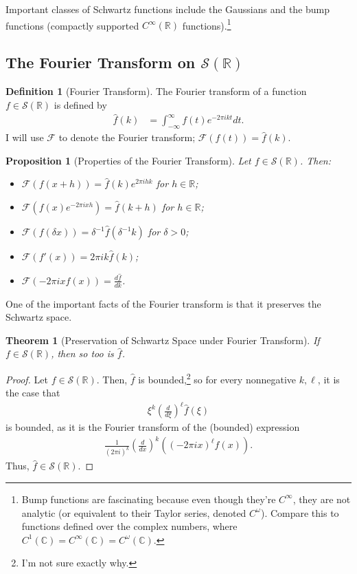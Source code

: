 \documentclass[12pt]{extarticle}
\newcommand{\R}{\mathbb{R}}
\newcommand{\C}{\mathbb{C}}
\theoremstyle{plain}
\newtheorem*{theorem}{Theorem}%
\newtheorem*{proposition}{Proposition}%
\theoremstyle{definition}
\newtheorem*{definition}{Definition}
\theoremstyle{remark}
\begin{document}
  Important classes of Schwartz functions include the Gaussians and the bump functions (compactly supported $C^{\infty}(\R)$ functions).\footnote{Bump functions are fascinating because even though they're $C^{\infty}$, they are not analytic (or equivalent to their Taylor series, denoted $C^{\omega}$). Compare this to functions defined over the complex numbers, where $C^{1}(\C) = C^{\infty}(\C) = C^{\omega}(\C)$.}
  \subsection{The Fourier Transform on $\mathcal{S}(\R)$}%
  \begin{definition}[Fourier Transform]
    The Fourier transform of a function $f\in \mathcal{S}(\R)$ is defined by
    \begin{align*}
      \hat{f}(k) &= \int_{-\infty}^{\infty}f(t)e^{-2\pi i k t}dt.
    \end{align*}
    I will use $\mathcal{F}$ to denote the Fourier transform; $\mathcal{F}(f(t)) = \hat{f}(k)$. 
  \end{definition}
  \begin{proposition}[Properties of the Fourier Transform]
    Let $f\in \mathcal{S}(\R)$. Then:
    \begin{itemize}
      \item $\displaystyle\mathcal{F}(f(x+h)) = \hat{f}(k)e^{2\pi i h k}$ for $h\in \R$;
      \item $\displaystyle \mathcal{F}\left(f(x)e^{-2\pi i x h}\right) = \hat{f}(k + h)$ for $h\in \R$;
      \item $\displaystyle \mathcal{F}\left(f(\delta x)\right) = \delta^{-1}\hat{f}(\delta^{-1}k)$ for $\delta > 0$;
      \item $\mathcal{F}(f'(x)) = 2\pi i k \hat{f}(k)$;
      \item $\mathcal{F}(-2\pi i x f(x)) = \frac{d\hat{f}}{dk}$.
    \end{itemize}
  \end{proposition}
  One of the important facts of the Fourier transform is that it preserves the Schwartz space.
  \begin{theorem}[Preservation of Schwartz Space under Fourier Transform]
    If $f\in \mathcal{S}(\R)$, then so too is $\hat{f}$.
  \end{theorem}
  \begin{proof}
    Let $f\in \mathcal{S}(\R)$. Then, $\hat{f}$ is bounded,\footnote{I'm not sure exactly why.} so for every nonnegative $k,\ell$, it is the case that
    \begin{align*}
      \xi^{k}\left(\frac{d}{d\xi}\right)^{\ell}\hat{f}(\xi)
    \end{align*}
    is bounded, as it is the Fourier transform of the (bounded) expression
    \begin{align*}
      \frac{1}{(2\pi i)^k}\left(\frac{d}{dx}\right)^k \left((-2\pi i x)^{\ell}f(x)\right).
    \end{align*}
    Thus, $\hat{f}\in \mathcal{S}(\R)$.
  \end{proof}
\end{document}
